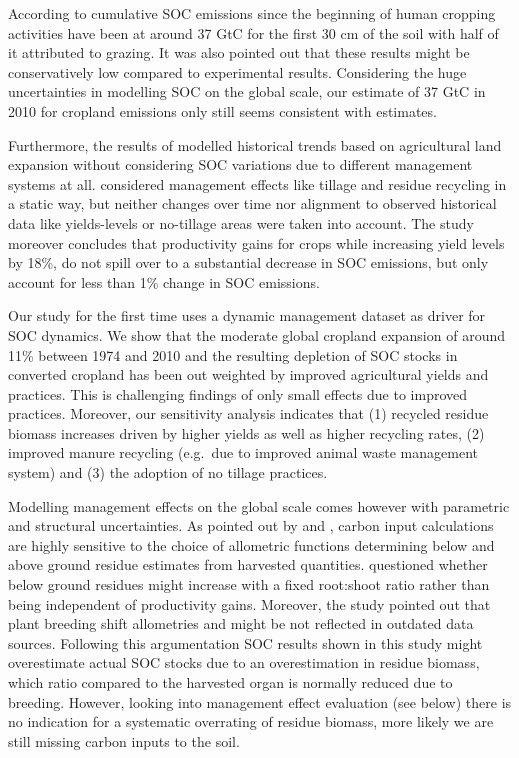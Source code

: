 \documentclass[gc, manuscript]{copernicus}
\begin{document}
According to \citep{sanderman_soil_2017} cumulative SOC emissions since the beginning of human cropping activities have been at around 37 GtC for the first 30 cm of the soil with half of it attributed to grazing. It was also pointed out that these results might be conservatively low compared to experimental results. Considering the huge uncertainties in modelling SOC on the global scale, our estimate of 37 GtC in 2010 for cropland emissions only still seems consistent with \citep{sanderman_soil_2017} estimates.

Furthermore, the results of \citep{sanderman_soil_2017} modelled historical trends based on agricultural land expansion without considering SOC variations due to different management systems at all. \citep{pugh_simulated_2015} considered management effects like tillage and residue recycling in a static way, but neither changes over time nor alignment to observed historical data like yields-levels or no-tillage areas were taken into account. The study moreover concludes that productivity gains for crops while increasing yield levels by 18\%, do not spill over to a substantial decrease in SOC emissions, but only account for less than 1\% change in SOC emissions.

Our study for the first time uses a dynamic management dataset as driver for SOC dynamics. We show that the moderate global cropland expansion of around 11\% between 1974 and 2010 and the resulting depletion of SOC stocks in converted cropland has been out weighted by improved agricultural yields and practices. This is challenging \citep{pugh_simulated_2015} findings of only small effects due to improved practices.
Moreover, our sensitivity analysis indicates that (1) recycled residue biomass increases driven by higher yields as well as higher recycling rates, (2) improved manure recycling (e.g.~due to improved animal waste management system) and (3) the adoption of no tillage practices.

Modelling management effects on the global scale comes however with parametric and structural uncertainties. As pointed out by \citep{keel_large_2017} and \citep{smith_how_2020}, carbon input calculations are highly sensitive to the choice of allometric functions determining below and above ground residue estimates from harvested quantities. \citep{keel_large_2017} questioned whether below ground residues might increase with a fixed root:shoot ratio rather than being independent of productivity gains. Moreover, the study pointed out that plant breeding shift allometries and might be not reflected in outdated data sources. Following this argumentation SOC results shown in this study might overestimate actual SOC stocks due to an overestimation in residue biomass, which ratio compared to the harvested organ is normally reduced due to breeding. However, looking into management effect evaluation (see below) there is no indication for a systematic overrating of residue biomass, more likely we are still missing carbon inputs to the soil.
\end{document}
